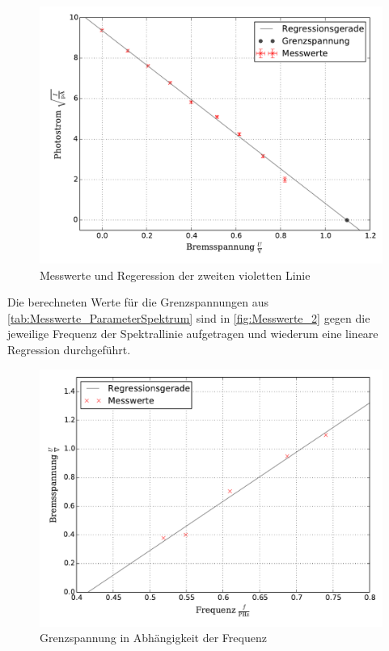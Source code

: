 		\begin{figure}[!h]
			\centering
			\includegraphics[scale=0.7]{Grafiken/Violett2.pdf}
			\caption{Messwerte und Regeression der zweiten violetten Linie \label{fig:Messwerte_Violett2}}
		\end{figure}
		
		Die berechneten Werte für die Grenzspannungen aus \cref{tab:Messwerte_ParameterSpektrum} 
		sind in \cref{fig:Messwerte_2} gegen die jeweilige Frequenz der Spektrallinie aufgetragen
		und wiederum eine lineare Regression durchgeführt.	
		
		\begin{figure}[!h]
			\centering
			\includegraphics[scale=0.7]{Grafiken/Messreihe2.pdf}
			\caption{Grenzspannung in Abhängigkeit der Frequenz \label{fig:Messwerte_Messwert2}}
		\end{figure}
		
